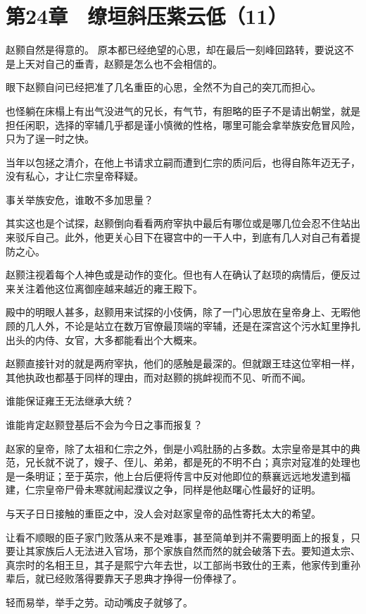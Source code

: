 \section{第24章　缭垣斜压紫云低（11）}

赵颢自然是得意的。
原本都已经绝望的心思，却在最后一刻峰回路转，要说这不是上天对自己的垂青，赵颢是怎么也不会相信的。

眼下赵颢自问已经把准了几名重臣的心思，全然不为自己的突兀而担心。

也怪躺在床榻上有出气没进气的兄长，有气节，有胆略的臣子不是请出朝堂，就是担任闲职，选择的宰辅几乎都是谨小慎微的性格，哪里可能会拿举族安危冒风险，只为了逞一时之快。

当年以包拯之清介，在他上书请求立嗣而遭到仁宗的质问后，也得自陈年迈无子，没有私心，才让仁宗皇帝释疑。

事关举族安危，谁敢不多加思量？

其实这也是个试探，赵颢倒向看看两府宰执中最后有哪位或是哪几位会忍不住站出来驳斥自己。此外，他更关心目下在寝宫中的一干人中，到底有几人对自己有着提防之心。

赵颢注视着每个人神色或是动作的变化。但也有人在确认了赵顼的病情后，便反过来关注着他这位离御座越来越近的雍王殿下。

殿中的明眼人甚多，赵颢用来试探的小伎俩，除了一门心思放在皇帝身上、无暇他顾的几人外，不论是站立在数万官僚最顶端的宰辅，还是在深宫这个污水缸里挣扎出头的内侍、女官，大多都能看出个大概来。

赵颢直接针对的就是两府宰执，他们的感触是最深的。但就跟王珪这位宰相一样，其他执政也都基于同样的理由，而对赵颢的挑衅视而不见、听而不闻。

谁能保证雍王无法继承大统？

谁能肯定赵颢登基后不会为今日之事而报复？

赵家的皇帝，除了太祖和仁宗之外，倒是小鸡肚肠的占多数。太宗皇帝是其中的典范，兄长就不说了，嫂子、侄儿、弟弟，都是死的不明不白；真宗对寇准的处理也是一条明证；至于英宗，他上台后便将传言中反对他即位的蔡襄远远地发遣到福建，仁宗皇帝尸骨未寒就闹起濮议之争，同样是他赵曙心性最好的证明。

与天子日日接触的重臣之中，没人会对赵家皇帝的品性寄托太大的希望。

让看不顺眼的臣子家门败落从来不是难事，甚至简单到并不需要明面上的报复，只要让其家族后人无法进入官场，那个家族自然而然的就会破落下去。要知道太宗、真宗时的名相王旦，其子是熙宁六年去世，以工部尚书致仕的王素，他家传到重孙辈后，就已经败落得要靠天子恩典才挣得一份俸禄了。

轻而易举，举手之劳。动动嘴皮子就够了。

